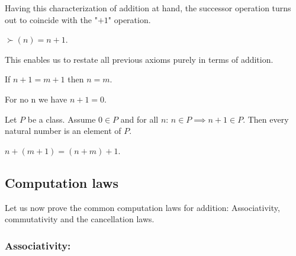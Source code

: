 \documentclass[../../arithmetic.ftl.tex]{subfiles}
\begin{document}
  Having this characterization of addition at hand, the successor operation
  turns out to coincide with the "$+ 1$" operation.

  \begin{forthel}
    \begin{lemma}
      $\succ(n) = n + 1$.
    \end{lemma}
  \end{forthel}

  This enables us to restate all previous axioms purely in terms of addition.

  \begin{forthel}
    \begin{corollary}\label{Arithmetic_01_02_631603}
      If $n + 1 = m + 1$ then $n = m$.
    \end{corollary}

    \begin{corollary}\label{Arithmetic_01_02_329014}
      For no n we have $n + 1 = 0$.
    \end{corollary}

    \begin{corollary}\label{Arithmetic_01_02_253087}
      Let $P$ be a class.
      Assume $0 \in P$ and for all $n$: $n \in P \implies n + 1 \in P$.
      Then every natural number is an element of $P$.
    \end{corollary}

    \begin{corollary}\label{Arithmetic_01_02_117171}
      $n + (m + 1) = (n + m) + 1$.
    \end{corollary}
  \end{forthel}


  \subsection{Computation laws}

  Let us now prove the common computation laws for addition: Associativity,
  commutativity and the cancellation laws.


  \subsubsection*{Associativity:}
\end{document}
